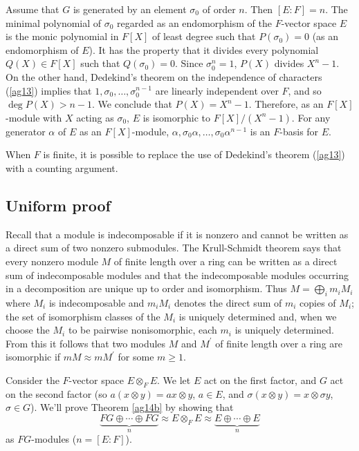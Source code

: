 \documentclass[a4paper,11pt,final,openany]{memoir}
\theoremstyle{nonumberplain}
\begin{document}
Assume that $G$ is generated by an element $\sigma_{0}$ of order $n$. Then
$[E\colon F]=n$. The minimal polynomial of $\sigma_{0}$ regarded as an
endomorphism of the $F$-vector space $E$ is the monic polynomial in $F[X]$ of
least degree such that $P(\sigma_{0})=0$ (as an endomorphism of $E$). It has
the property that it divides every polynomial $Q(X)\in F[X]$ such that
$Q(\sigma_{0})=0$. Since $\sigma_{0}^{n}=1$, $P(X)$ divides $X^{n}-1$. On the
other hand, Dedekind's theorem on the independence of characters (\ref{ag13})
implies that $1,\sigma_{0},\ldots,\sigma_{0}^{n-1}$ are linearly independent
over $F$, and so $\deg P(X)>n-1$. We conclude that $P(X)=X^{n}-1$. Therefore,
as an $F[X]$-module with $X$ acting as $\sigma_{0}$, $E$ is isomorphic to
$F[X]/(X^{n}-1)$. For any generator $\alpha$ of $E$ as an $F[X]$-module,
$\alpha,\sigma_{0}\alpha,\ldots,\sigma_{0}\alpha^{n-1}$ is an $F$-basis for
$E$.

When $F$ is finite, it is possible to replace the use of Dedekind's theorem
(\ref{ag13}) with a counting argument.

\subsection{Uniform proof}

Recall that a module is indecomposable if it is nonzero and cannot be written
as a direct sum of two nonzero submodules. The Krull-Schmidt theorem says that
every nonzero module $M$ of finite length over a ring can be written as a
direct sum of indecomposable modules and that the indecomposable modules
occurring in a decomposition are unique up to order and isomorphism. Thus
$M=\bigoplus_{i}m_{i}M_{i}$ where $M_{i}$ is indecomposable and $m_{i}M_{i}$
denotes the direct sum of $m_{i}$ copies of $M_{i}$; the set of isomorphism
classes of the $M_{i}$ is uniquely determined and, when we choose the $M_{i}$
to be pairwise nonisomorphic, each $m_{i}$ is uniquely determined. From this
it follows that two modules $M$ and $M^{\prime}$ of finite length over a ring
are isomorphic if $mM\approx mM^{\prime}$ for some $m\geq1$.

Consider the $F$-vector space $E\otimes_{F}E$. We let $E$ act on the first
factor, and $G$ act on the second factor (so $a(x\otimes y)=ax\otimes y$,
$a\in E$, and $\sigma(x\otimes y)=x\otimes\sigma y$, $\sigma\in G$). We'll
prove Theorem \ref{ag14b} by showing that%
\[
\underbrace{FG\oplus\cdots\oplus FG}_{n}\approx E\otimes_{F}E\approx
\underbrace{E\oplus\cdots\oplus E}_{n}%
\]
as $FG$-modules ($n=[E\colon F]$).
\end{document}
